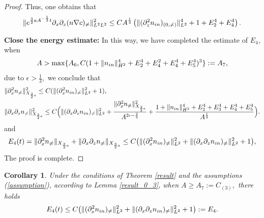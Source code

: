 \documentclass[12pt, reqno]{amsart}
\newtheorem{corollary}{Corollary}[section]
\numberwithin{equation}{section}
\begin{document}
\begin{proof}
		Thus, one obtains  that 
		\begin{equation*}
			\begin{aligned}
				\|{\rm e}^{\frac32aA^{-\frac{1}{3}}t}
				\partial_x\partial_z(n\nabla c)_{\neq}\|^2_{L^2L^2}\leq 
				CA^{\frac13}\left(\|(\partial_z^2n_{\rm in})_{(0,\neq)}\|^4_{L^2}
				+1+E_2^4+E_4^4\right).
			\end{aligned}
		\end{equation*}
		
		\noindent\textbf{Close the energy estimate:}
		In this way, we have completed the estimate of $E_4$, when $$A>\max\{A_6, C(1+\|n_{\rm in}\|_{H^2}^4+E_2^4+E_4^2+E_4^4+E_5^4)^{3}\}:=A_7,$$  
		due to $\epsilon>\frac13,$
		we conclude  that 
		\begin{equation*}
			\begin{aligned}
				&\|\partial_x^2n_{\neq}\|^2_{X_{\frac32a}}
				\leq C( \|(\partial_x^2n_{\rm in})_{\neq}\|^2_{L^2}+1),\\
				&\|\partial_x\partial_zn_{\neq}\|^2_{X_{\frac32a}}
				\leq 
				C\Big( \|(\partial_x\partial_zn_{\rm in})_{\neq}\|^2_{L^2}+
				\frac{\|\partial_x^2 n_{\neq}\|_{X_{\frac32a}}^2}
				{A^{2\epsilon-\frac{2}{3}}}+\frac{1
					+\|n_{\rm in}\|_{H^2}^4
					+E_2^4+E_3^4+E_4^4+E_5^4}{A^{\frac13}}\Big).
			\end{aligned}
		\end{equation*}
		and
		\begin{equation*}
			\begin{aligned}
				E_4(t)=\|\partial_x^2n_{\neq}\|_{X_{\frac32a}}+
				\|\partial_x\partial_zn_{\neq}\|_{X_{\frac32a}}
				\leq C\big(\|(\partial_x^2n_{\rm in})_{\neq}\|^2_{L^2}
				+\|(\partial_x\partial_zn_{\rm in})_{\neq}\|^2_{L^2}+1\big),
			\end{aligned}
		\end{equation*}
		The proof is complete.
	\end{proof}
	
	\begin{corollary}
		Under the conditions of Theorem \ref{result} and the assumptions (\ref{assumption}),
		according to Lemma \ref{result_0_3}, when $A\geq A_7:=C_{(3)},$
		there holds
		\begin{equation}
			E_4(t)\leq C\big(\|(\partial_x^2n_{\rm in})_{\neq}\|^2_{L^2}
			+\|(\partial_x\partial_zn_{\rm in})_{\neq}\|^2_{L^2}+1\big):=E_4.
		\end{equation}
	\end{corollary}
	
\end{document}
